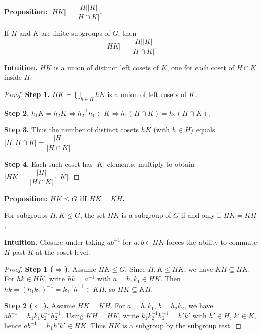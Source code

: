 \documentclass[9pt]{article}
\theoremstyle{definition}
\begin{document}
\newpage

\noindent\textbf{Proposition: $|HK|=\dfrac{|H||K|}{|H\cap K|}$.}

\newpage

If $H$ and $K$ are finite subgroups of $G$, then
\[
|HK|=\frac{|H||K|}{|H\cap K|}.
\]

\dotfill

\noindent\textbf{Intuition.}
$HK$ is a union of distinct left cosets of $K$, one for each coset of $H\cap K$ inside $H$.

\dotfill

\begin{proof}
\textbf{Step 1.} $HK=\bigcup_{h\in H}hK$ is a union of left cosets of $K$.

\textbf{Step 2.} $h_1K=h_2K\iff h_2^{-1}h_1\in K\iff h_1(H\cap K)=h_2(H\cap K)$.

\textbf{Step 3.} Thus the number of distinct cosets $hK$ (with $h\in H$) equals $|H:H\cap K|=\dfrac{|H|}{|H\cap K|}$.

\textbf{Step 4.} Each such coset has $|K|$ elements; multiply to obtain $|HK|=\dfrac{|H|}{|H\cap K|}\cdot |K|$.
\end{proof}

\newpage

\noindent\textbf{Proposition: $HK\le G$ iff $HK=KH$.}

\newpage

For subgroups $H,K\le G$, the set $HK$ is a subgroup of $G$ if and only if $HK=KH$.

\dotfill

\noindent\textbf{Intuition.}
Closure under taking $ab^{-1}$ for $a,b\in HK$ forces the ability to commute $H$ past $K$ at the coset level.

\dotfill

\begin{proof}
\textbf{Step 1 ($\Rightarrow$).} Assume $HK\le G$. Since $H,K\le HK$, we have $KH\subseteq HK$. For $hk\in HK$, write $hk=a^{-1}$ with $a=h_1k_1\in HK$. Then $hk=(h_1k_1)^{-1}=k_1^{-1}h_1^{-1}\in KH$, so $HK\subseteq KH$.

\textbf{Step 2 ($\Leftarrow$).} Assume $HK=KH$. For $a=h_1k_1$, $b=h_2k_2$, we have $ab^{-1}=h_1k_1k_2^{-1}h_2^{-1}$. Using $KH=HK$, write $k_1k_2^{-1}h_2^{-1}=h'k'$ with $h'\in H$, $k'\in K$, hence $ab^{-1}=h_1h'k'\in HK$. Thus $HK$ is a subgroup by the subgroup test.
\end{proof}

\newpage
\end{document}
